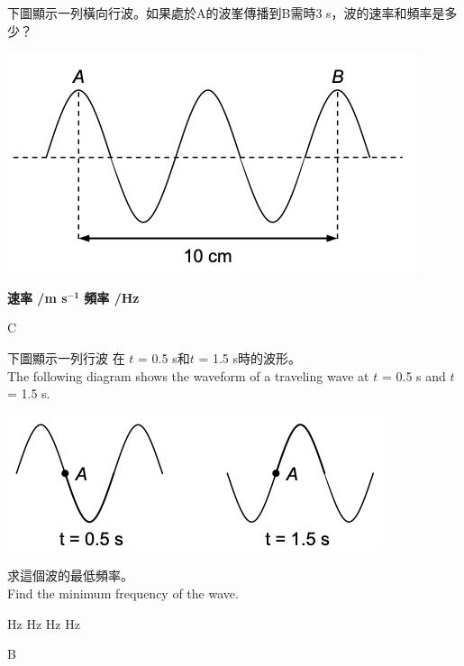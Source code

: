 {
    下圖顯示一列橫向行波。如果處於A的波峯傳播到B需時3 s，波的速率和頻率是多少？
    \par{\par\centering\includegraphics[width=.4\textwidth]{./img/ch1_earlyclass_wave_mc_2024-05-13-16-05-45.png}\par}
    \begin{tasks}
        \task [] \textbf{速率 /m s}$\mathbf{^{-1}}$ \tab\tab \textbf{頻率 /Hz}
         \tab{}
         \tab{}
         \tab{}
         \tab{}
    \end{tasks}

}{C}

{
    下圖顯示一列行波 在 $t$ = 0.5 s和$t$ = 1.5 s時的波形。
    \\The following diagram shows the waveform of a traveling wave at $t$ = 0.5 s and $t$ = 1.5 s.
    \par{\par\centering\includegraphics[width=.4\textwidth]{./img/ch1_earlyclass_wave_mc_2024-05-13-16-11-35.png}\par}
    求這個波的最低頻率。\\Find the minimum frequency of the wave.
    \begin{tasks}
         Hz
         Hz
         Hz
         Hz
    \end{tasks}

}{B}

